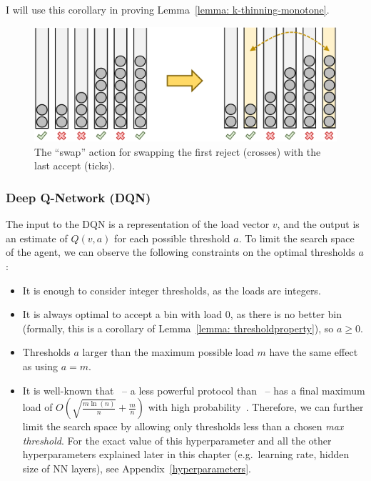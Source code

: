 I will use this corollary in proving Lemma~\ref{lemma: k-thinning-monotone}.


\begin{figure}
    \centering
    \includegraphics[scale=0.5]{Chapter3/Figs/two_thinning_swap.pdf}
    \caption{The ``swap'' action for \TwoThinning swapping the first reject (crosses) with the last accept (ticks).}
    \label{two-thinning-swap-action}
\end{figure}


\subsubsection*{Deep Q-Network (DQN)} \label{DQN}

The input to the DQN is a representation of the load vector $v$, and the output is an estimate of $Q(v, a)$ for each possible threshold $a$. To limit the search space of the agent, we can observe the following constraints on the optimal thresholds $a$:

\begin{itemize}
    \item It is enough to consider integer thresholds, as the loads are integers.
    \item It is always optimal to accept a bin with load $0$, as there is no better bin (formally, this is a corollary of Lemma~\ref{lemma: thresholdproperty}), so $a\geq 0$.
    \item Thresholds $a$ larger than the maximum possible load $m$ have the same effect as using $a=m$.
    \item It is well-known that \OneChoice\ -- a less powerful protocol than \TwoThinning\ -- has a final maximum load of $O(\sqrt{\frac{m\ln (n)}{n}}+\frac{m}{n})$ with high probability~\cite{raab1998onechoice}. Therefore, we can further limit the search space by allowing only thresholds less than a chosen \textit{max threshold}. For the exact value of this hyperparameter and all the other hyperparameters explained later in this chapter (e.g.\ learning rate, hidden size of NN layers), see Appendix~\ref{hyperparameters}.
    
\end{itemize}


